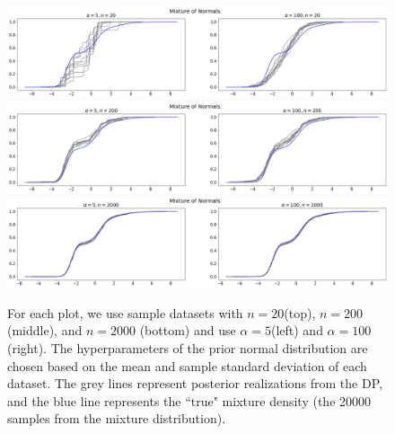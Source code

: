 \documentclass[a4paper, 10pt]{article}
\begin{document}
\begin{enumerate}
    \begin{figure}[h!]
        \centering
        \includegraphics[scale = 0.33]{hw1b_20.png}
        \includegraphics[scale = 0.33]{hw1b_200.png}
        \includegraphics[scale = 0.33]{hw1b_2000.png}
        \caption{For each plot, we use sample datasets with $n=20$(top), $n=200$(middle), and $n = 2000$ (bottom) and use $\alpha = 5$(left) and $\alpha = 100$(right). The hyperparameters of the prior normal distribution are chosen based on the mean and sample standard deviation of each dataset. The grey lines represent posterior realizations from the DP, and the blue line represents the ``true" mixture density (the 20000 samples from the mixture distribution).}
        \label{1b_posterior}
    \end{figure}
    

\end{enumerate}
\end{document}
